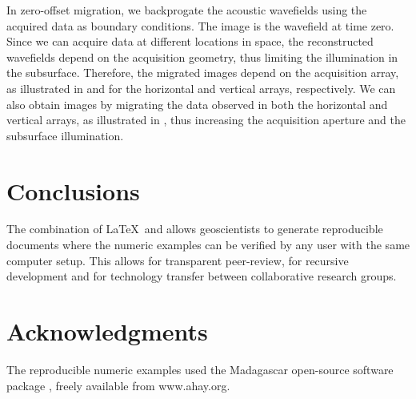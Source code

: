 

In zero-offset migration, we backprogate the acoustic wavefields using
the acquired data as boundary conditions. The image is the wavefield
at time zero. Since we can acquire data at different locations in
space, the reconstructed wavefields depend on the acquisition
geometry, thus limiting the illumination in the subsurface. Therefore,
the migrated images depend on the acquisition array, as illustrated in
 and  for the horizontal and vertical arrays,
respectively.  We can also obtain images by migrating the data
observed in both the horizontal and vertical arrays, as illustrated in
, thus increasing the acquisition aperture and the
subsurface illumination.



\section{Conclusions}
The combination of \LaTeX\ and \mg allows geoscientists to generate
reproducible documents where the numeric examples can be verified by
any user with the same computer setup. This allows for transparent
peer-review, for recursive development and for technology transfer
between collaborative research groups.

\section{Acknowledgments}
The reproducible numeric examples used the Madagascar open-source
software package \cite[]{m8r}, freely available from www.ahay.org.



